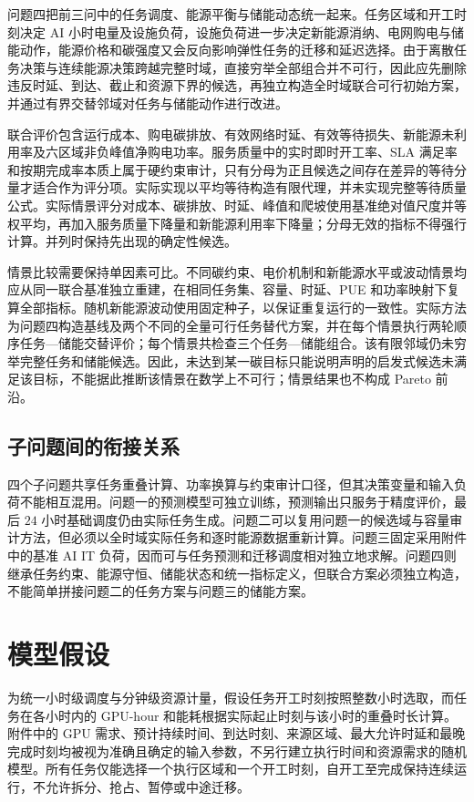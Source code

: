 \documentclass[withoutpreface,bwprint]{cumcmthesis}
\begin{document}
问题四把前三问中的任务调度、能源平衡与储能动态统一起来。任务区域和开工时刻决定 AI 小时电量及设施负荷，设施负荷进一步决定新能源消纳、电网购电与储能动作，能源价格和碳强度又会反向影响弹性任务的迁移和延迟选择。由于离散任务决策与连续能源决策跨越完整时域，直接穷举全部组合并不可行，因此应先删除违反时延、到达、截止和资源下界的候选，再独立构造全时域联合可行初始方案，并通过有界交替邻域对任务与储能动作进行改进。

联合评价包含运行成本、购电碳排放、有效网络时延、有效等待损失、新能源未利用率及六区域非负峰值净购电功率。服务质量中的实时即时开工率、SLA 满足率和按期完成率本质上属于硬约束审计，只有分母为正且候选之间存在差异的等待分量才适合作为评分项。实际实现以平均等待构造有限代理，并未实现完整等待质量公式。实际情景评分对成本、碳排放、时延、峰值和爬坡使用基准绝对值尺度并等权平均，再加入服务质量下降量和新能源利用率下降量；分母无效的指标不得强行计算。并列时保持先出现的确定性候选。

情景比较需要保持单因素可比。不同碳约束、电价机制和新能源水平或波动情景均应从同一联合基准独立重建，在相同任务集、容量、时延、PUE 和功率映射下复算全部指标。随机新能源波动使用固定种子，以保证重复运行的一致性。实际方法为问题四构造基线及两个不同的全量可行任务替代方案，并在每个情景执行两轮顺序任务—储能交替评价；每个情景共检查三个任务—储能组合。该有限邻域仍未穷举完整任务和储能候选。因此，未达到某一碳目标只能说明声明的启发式候选未满足该目标，不能据此推断该情景在数学上不可行；情景结果也不构成 Pareto 前沿。

\subsection{子问题间的衔接关系}

四个子问题共享任务重叠计算、功率换算与约束审计口径，但其决策变量和输入负荷不能相互混用。问题一的预测模型可独立训练，预测输出只服务于精度评价，最后 $24$ 小时基础调度仍由实际任务生成。问题二可以复用问题一的候选域与容量审计方法，但必须以全时域实际任务和逐时能源数据重新计算。问题三固定采用附件中的基准 AI IT 负荷，因而可与任务预测和迁移调度相对独立地求解。问题四则继承任务约束、能源守恒、储能状态和统一指标定义，但联合方案必须独立构造，不能简单拼接问题二的任务方案与问题三的储能方案。

\section{模型假设}

为统一小时级调度与分钟级资源计量，假设任务开工时刻按照整数小时选取，而任务在各小时内的 GPU-hour 和能耗根据实际起止时刻与该小时的重叠时长计算。附件中的 GPU 需求、预计持续时间、到达时刻、来源区域、最大允许时延和最晚完成时刻均被视为准确且确定的输入参数，不另行建立执行时间和资源需求的随机模型。所有任务仅能选择一个执行区域和一个开工时刻，自开工至完成保持连续运行，不允许拆分、抢占、暂停或中途迁移。
\end{document}
